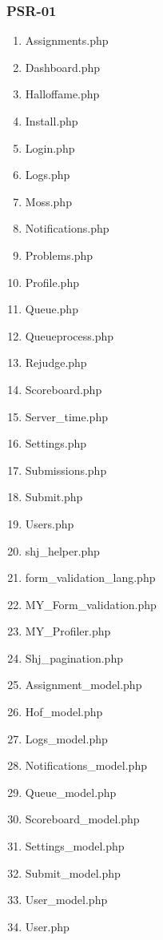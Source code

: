 \subsubsection{PSR-01}
\begin{enumerate}
	\item Assignments.php
	\item Dashboard.php
	\item Halloffame.php
	\item Install.php
	\item Login.php
	\item Logs.php
	\item Moss.php
	\item Notifications.php
	\item Problems.php
	\item Profile.php
	\item Queue.php
	\item Queueprocess.php
	\item Rejudge.php
	\item Scoreboard.php
	\item Server\_time.php
	\item Settings.php
	\item Submissions.php
	\item Submit.php
	\item Users.php
	\item shj\_helper.php
	\item form\_validation\_lang.php
	\item MY\_Form\_validation.php
	\item MY\_Profiler.php
	\item Shj\_pagination.php
	\item Assignment\_model.php
	\item Hof\_model.php
	\item Logs\_model.php
	\item Notifications\_model.php
	\item Queue\_model.php
	\item Scoreboard\_model.php
	\item Settings\_model.php
	\item Submit\_model.php
	\item User\_model.php
	\item User.php
\end{enumerate}


